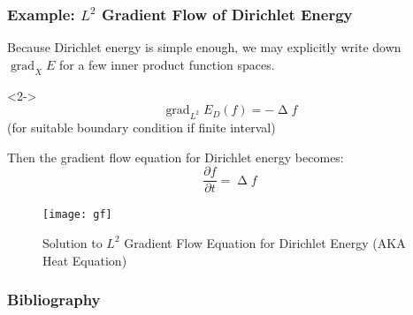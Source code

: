 \documentclass{beamer}
\theoremstyle{remark}
\DeclareMathOperator{\grad}{grad}
\DeclareMathOperator{\laplace}{\Delta}
\begin{document}
\begin{frame}
    \frametitle{Example: $L^2$ Gradient Flow of Dirichlet Energy}
    Because Dirichlet energy is simple enough, we may explicitly write down $\grad_{X} E$ for a few inner product function spaces.
    \begin{lemma}<2->
        \begin{equation*}
            \grad_{L^2} E_D (f) = - \laplace f
        \end{equation*}
        (for suitable boundary condition if finite interval)
    \end{lemma}

    {
    Then the gradient flow equation for Dirichlet energy becomes:
    \begin{equation}
        \frac{\partial f}{\partial t} = \laplace f
    \end{equation}
}
\end{frame}

\begin{frame}
    \begin{figure}[h]
        \centering
        \texttt{[image: gf]}
        \caption{Solution to $L^2$ Gradient Flow Equation for Dirichlet Energy (AKA Heat Equation)}
    \end{figure}
\end{frame}



\begin{frame}
    \frametitle{Bibliography}
    \printbibliography
\end{frame}
\end{document}
